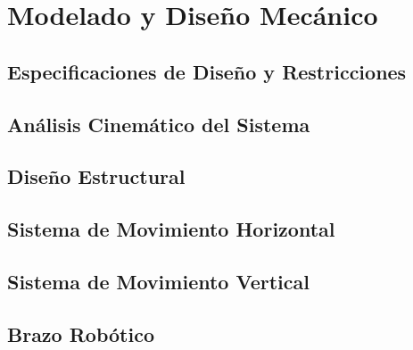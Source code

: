 \documentclass[a4paper,12pt]{report}
\begin{document}
\section{Modelado y Diseño Mecánico}

\subsection{Especificaciones de Diseño y Restricciones}


\subsection{Análisis Cinemático del Sistema}




\subsection{Diseño Estructural}




\subsection{Sistema de Movimiento Horizontal}




\subsection{Sistema de Movimiento Vertical}




\subsection{Brazo Robótico}



\end{document}
